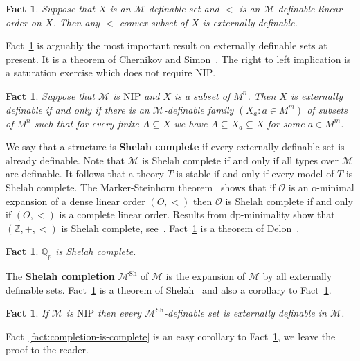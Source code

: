 \documentclass[bibalpha]{amsart}
\newtheorem{fact}[theorem]{Fact}
\theoremstyle{definition}
\theoremstyle{remark}
\newcommand{\Sh}[1]{\ensuremath{\mathscr{#1}^{\mathrm{Sh}}}}
\newcommand{\nip}{\mathrm{NIP}}
\newcommand{\Sa}[1]{\ensuremath{\mathscr{#1}}}
\newcommand{\Z}{\mathbb{Z}}
\newcommand{\Q}{\mathbb{Q}}
\begin{document}
\begin{fact}
\label{fact:convex}
Suppose that $X$ is an $\Sa M$-definable set and $<$ is an $\Sa M$-definable linear order on $X$.
Then any $<$-convex subset of $X$ is externally definable.
\end{fact}

\noindent
Fact~\ref{fact:cs} is arguably the most important result on externally definable sets at present.
It is a theorem of Chernikov and Simon~\cite{CS-II}.
The right to left implication is a saturation exercise which does not require $\nip$.

\begin{fact}
\label{fact:cs}
Suppose that $\Sa M$ is $\nip$ and $X$ is a subset of $M^n$.
Then $X$ is externally definable if and only if there is an $\Sa M$-definable family $(X_a : a \in M^m)$ of subsets of $M^n$ such that for every finite $A \subseteq X$ we have $A \subseteq X_a \subseteq X$ for some $a \in M^m$.
\end{fact}

\noindent
We say that a structure is \textbf{Shelah complete} if every externally definable set is already definable.
Note that $\Sa M$ is Shelah complete if and only if all types over $\Sa M$ are definable.
It follows that a theory $T$ is stable if and only if every model of $T$ is Shelah complete.
The Marker-Steinhorn theorem~\cite{Marker-Steinhorn} shows that if $\Sa O$ is an o-minimal expansion of a dense linear order $(O,<)$ then $\Sa O$ is Shelah complete if and only if $(O,<)$ is a complete linear order.
Results from dp-minimality show that $(\Z,+,<)$ is Shelah complete, see~\cite{SW-dp}.
Fact~\ref{fact:delon} is a theorem of Delon~\cite{Delon-def}.

\begin{fact}
\label{fact:delon}
$\Q_p$ is Shelah complete.
\end{fact}

\noindent
The \textbf{Shelah completion} $\Sh M$ of $\Sa M$ is the expansion of $\Sa M$ by all externally definable sets.
Fact~\ref{fact:shelah} is a theorem of Shelah~\cite{Shelah-external} and also a corollary to Fact~\ref{fact:cs}.

\begin{fact}
\label{fact:shelah}
If $\Sa M$ is $\nip$ then every $\Sh M$-definable set is externally definable in $\Sa M$.
\end{fact}

\noindent
Fact~\ref{fact:completion-is-complete} is an easy corollary to Fact~\ref{fact:shelah}, we leave the proof to the reader.
\end{document}
